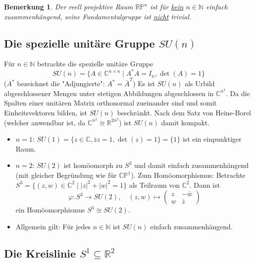 \documentclass[a4paper,11pt,notitlepage]{report}
\newtheorem{remark}{Bemerkung}[chapter]
\newcommand{\R}{{\ensuremath{\mathbb{R}}}}
\newcommand{\N}{{\ensuremath{\mathbb{N}}}}
\newcommand{\C}{{\ensuremath{\mathbb{C}}}}
\newcommand{\Prim}{{\ensuremath{\mathbb{P}}}}
\begin{document}
\begin{remark}
	Der reell projektive Raum $\R \Prim^n$ ist für \underline{kein} $n \in \N$ einfach zusammenhängend, seine Fundamentalgruppe ist \underline{nicht} trivial.
\end{remark}

\subsection{Die spezielle unitäre Gruppe $SU(n)$}
Für $n \in \N$ betrachte die spezielle unitäre Gruppe $$SU(n) = \{ A \in \C^{n \times n} \mid A^* A = I_n, \det(A) = 1\}$$
($A^*$ bezeichnet die "Adjungierte":  $A^* = \bar{A}^T$) \newline
Es ist $SU(n)$ als Urbild abgeschlossener Mengen unter stetigen Abbildungen abgeschlossen in $\C^{n^2}$. Da die Spalten einer unitären Matrix orthonormal zueinander sind und somit Einheitsvektoren bilden, ist $SU(n)$ beschränkt. Nach dem Satz von Heine-Borel (welcher anwendbar ist, da $\C^{n^2} \cong \R^{2n^2}$) ist $SU(n)$ damit kompakt.
\begin{itemize}
	\item \underline{$n=1$}: $SU(1) = \{ z \in \C, \bar{z}z = 1, \det(z) = 1\} = \{1\}$ ist ein einpunktiger Raum.
	\item \underline{$n=2$}: $SU(2)$ ist homöomorph zu $S^3$ und damit einfach zusammenhängend (mit gleicher Begründung wie für $\C \Prim ^1$). \newline
	Zum Homöomorphismus:
	\newline
	Betrachte $S^3 = \{(z,w) \in \C^2 \mid |z|^2 + |w|^2 = 1 \}$ als Teilraum von $\C^2$.
	Dann ist
		$$\varphi \colon S^3 \rightarrow SU(2), \quad (z,w) \mapsto \begin{pmatrix}
		z & -\bar{w} \\ w & \bar{z}
		\end{pmatrix} $$
	ein Homöomorphismus $S^3 \cong SU(2)$.
	\item Allgemein gilt: Für jedes $n \in \N$ ist $SU(n)$ einfach zusammenhängend.
\end{itemize}

\subsection{Die Kreislinie $S^1 \subseteq \R^2$}
\end{document}
